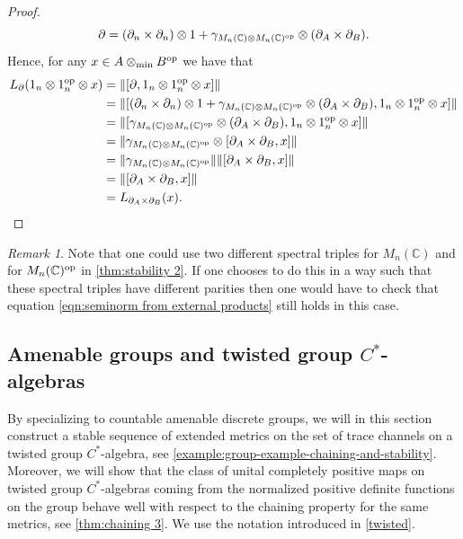 \documentclass[11pt, a4paper, oneside, final, reqno]{amsart}
\newcommand{\bbC}{\mathbb{C}}
\theoremstyle{definition}
\theoremstyle{plain}
\theoremstyle{remark}
\newtheorem{remark}[definition]{Remark}
\numberwithin{equation}{section}
\begin{document}
\begin{proof}
    \begin{equation*}
        \partial
        = (\partial_n \times \partial_n) \otimes 1
        + \gamma_{M_n(\bbC) \otimes M_n(\bbC)^{\rm op}} \otimes (\partial_A \times \partial_B).
    \end{equation*}
    Hence, for any $x \in A \otimes_{\rm min} B^{\rm op}$ we have that
    \begin{align*}
        L_\partial(1_n \otimes 1_n^{\rm op} \otimes x)
        & = \|[\partial, 1_n \otimes 1_n^{\rm op} \otimes x]\| \\
        & = \|[(\partial_n \times \partial_n) \otimes 1 + \gamma_{M_n(\bbC) \otimes M_n(\bbC)^{\rm op}} \otimes (\partial_A \times \partial_B), 1_n \otimes 1_n^{\rm op} \otimes x]\| \\
        & = \|[\gamma_{M_n(\bbC) \otimes M_n(\bbC)^{\rm op}} \otimes (\partial_A \times \partial_B), 1_n \otimes 1_n^{\rm op} \otimes x]\| \\
        & = \|\gamma_{M_n(\bbC) \otimes M_n(\bbC)^{\rm op}} \otimes [\partial_A \times \partial_B, x]\| \\
        & = \|\gamma_{M_n(\bbC) \otimes M_n(\bbC)^{\rm op}}\| \|[\partial_A \times \partial_B, x]\| \\
        & = \| [\partial_A \times \partial_B, x]\| \\
        & = L_{\partial_A \times \partial_B}(x). \qedhere
    \end{align*}
\end{proof}

\begin{remark}
    Note that one could use two different spectral triples for $M_n(\bbC)$ and for $M_n(\bbC)^{\rm op}$ in \cref{thm:stability 2}. If one chooses to do this in a way such that these spectral triples have different parities then one would have to check that equation \eqref{eqn:seminorm from external products} still holds in this case.
\end{remark}

\subsection{Amenable groups and twisted group \texorpdfstring{$C^*$}{C*}-algebras}\label{sec:group-Cstar-algebras-and-length-functions}

By specializing to countable amenable discrete groups, we will in this section construct a stable sequence of extended metrics on the set of trace channels on a twisted group $C^*$-algebra, see \cref{example:group-example-chaining-and-stability}. Moreover, we will show that the class of unital completely positive maps on twisted group $C^*$-algebras coming from the normalized positive definite functions on the group behave well with respect to the chaining property for the same metrics, see \cref{thm:chaining 3}. We use the notation introduced in \cref{twisted}.
\end{document}
